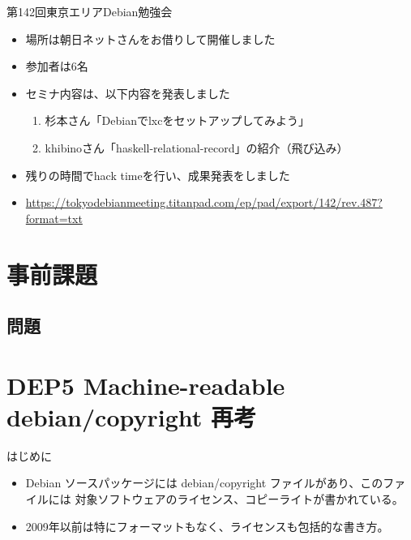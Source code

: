 \begin{frame}{第142回東京エリアDebian勉強会}

\begin{itemize}
\item 場所は朝日ネットさんをお借りして開催しました
\item 参加者は6名
\item セミナ内容は、以下内容を発表しました
  \begin{enumerate}
  \item 杉本さん「Debianでlxcをセットアップしてみよう」
  \item khibinoさん「haskell-relational-record」の紹介（飛び込み）
  \end{enumerate}
\item 残りの時間でhack timeを行い、成果発表をしました
\item \url{https://tokyodebianmeeting.titanpad.com/ep/pad/export/142/rev.487?format=txt}
\end{itemize} 
\end{frame}

\section{事前課題}
{\footnotesize
 
}

\subsection{問題}



\section{DEP5 Machine-readable debian/copyright 再考}

\begin{frame}{はじめに}

\begin{itemize}
\item  Debian ソースパッケージには debian/copyright ファイルがあり、このファイルには
対象ソフトウェアのライセンス、コピーライトが書かれている。
\item 2009年以前は特にフォーマットもなく、ライセンスも包括的な書き方。
\end{itemize}
\end{frame}

